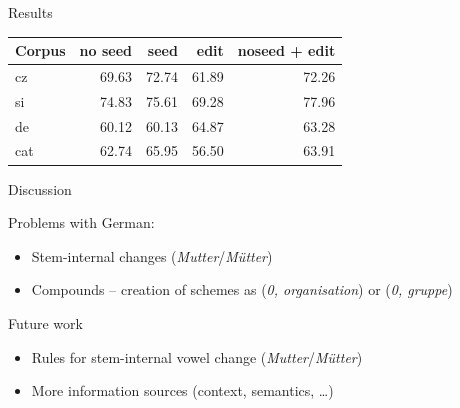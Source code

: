 \documentclass[hyperref={pdfencoding=unicode, unicode=true}]{beamer}
\begin{document}
\begin{frame}{Results}
\begin{center}
\begin{tabular}{lrrrr}
\toprule
\bf Corpus & \bf no seed & \bf seed & \bf edit & \bf noseed + edit \\
\midrule
cz & 69.63 & 72.74 & 61.89 & 72.26\\
si & 74.83 & 75.61 & 69.28 & 77.96\\
de & 60.12 & 60.13 & 64.87 & 63.28\\
cat & 62.74 & 65.95 & 56.50 & 63.91\\
\bottomrule
\end{tabular}
\end{center}
\end{frame}

\begin{frame}{Discussion}

Problems with German:

\begin{itemize}
\item Stem-internal changes (\emph{Mutter}/\emph{M\"{u}tter})

\item Compounds -- creation of schemes as (\emph{0, organisation}) or (\emph{0, gruppe})
\end{itemize}
\end{frame}

\begin{frame}{Future work}
\begin{itemize}

\item Rules for stem-internal vowel change (\emph{Mutter}/\emph{M\"{u}tter})

\item More information sources (context, semantics, \ldots)

\end{itemize}
\end{frame}
\end{document}
